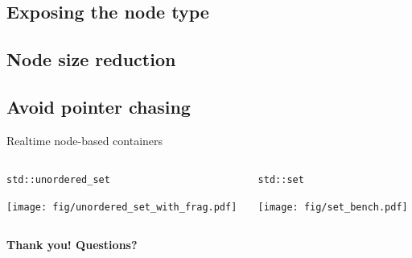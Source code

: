 \documentclass[10pt,aspectratio=169]{beamer}
\begin{document}
\subsection[Exposing the node type]{Exposing the node type}
\subsection[Node size reduction]{Node size reduction}
\subsection[Avoid pointer chasing]{Avoid pointer chasing}

\begin{frame}{Realtime node-based containers}
    \begin{columns}
        \begin{column}{0.5\textwidth}
            \texttt{std::unordered\_set}
            \begin{center}
                \texttt{[image: fig/unordered\_set\_with\_frag.pdf]} \\
            \end{center}
        \end{column}

        \begin{column}{0.5\textwidth}
            \texttt{std::set}
            \begin{center}
                \texttt{[image: fig/set\_bench.pdf]} \\
            \end{center}
        \end{column}
    \end{columns}
\end{frame}

\begin{frame}{}
    \vspace{1cm}
    \begin{center}
        {\Large \bf Thank you! Questions?} 
    \end{center}
\end{frame}
\end{document}
